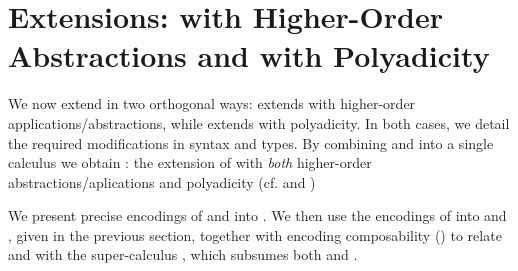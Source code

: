 \documentclass[preprint,11pt]{elsarticle}
\begin{document}
{%

\section{Extensions: \HOp with Higher-Order Abstractions and with Polyadicity}
\label{sec:extension}
%

We now extend \HOp in two orthogonal ways: %
\HOpp  extends   \HOp with higher-order applications/abstractions, while
\PHOp   extends  \HOp
with polyadicity.
In both cases, we detail the
required modifications in syntax and types.
By combining \HOpp and \PHOp into a single calculus we obtain \PHOpp:
the extension of \HOp with \emph{both} higher-order
abstractions/aplications and polyadicity (cf.  and )

We present precise encodings of \HOpp and \PHOp into \HOp.
We then use the encodings of \HOp into \HO and \sessp, given in the previous section, 
together with 
encoding composability () to relate \HO and \sessp with the super-calculus \PHOpp, which subsumes
both \HOpp and \PHOp.


}
\end{document}
